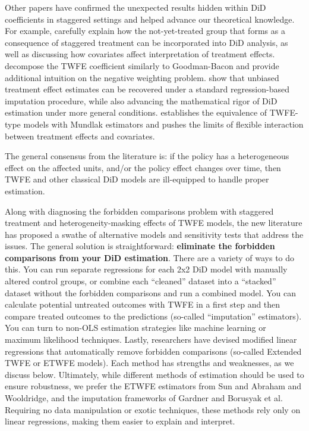 \documentclass[12pt]{article}
\begin{document}
Other papers have confirmed the unexpected results hidden within DiD coefficients in staggered settings and helped advance our theoretical knowledge. For example, \citet{CS2021} carefully explain how the not-yet-treated group that forms as a consequence of staggered treatment can be incorporated into DiD analysis, as well as discussing how covariates affect interpretation of treatment effects. \citet{de2020two} decompose the TWFE coefficient similarly to Goodman-Bacon and provide additional intuition on the negative weighting problem. \citet{borusyak2024revisiting} show that unbiased treatment effect estimates can be recovered under a standard regression-based imputation procedure, while also advancing the mathematical rigor of DiD estimation under more general conditions. \citet{wooldridge2021two} establishes the equivalence of TWFE-type models with Mundlak estimators and pushes the limits of flexible interaction between treatment effects and covariates.

The general consensus from the literature is: if the policy has a heterogeneous effect on the affected units, and/or the policy effect changes over time, then TWFE and other classical DiD models are ill-equipped to handle proper estimation.

Along with diagnosing the forbidden comparisons problem with staggered treatment and heterogeneity-masking effects of TWFE models, the new literature has proposed a swathe of alternative models and sensitivity tests that address the issues. The general solution is straightforward: \textbf{eliminate the forbidden comparisons from your DiD estimation}. There are a variety of ways to do this. You can run separate regressions for each 2x2 DiD model with manually altered control groups, or combine each “cleaned” dataset into a “stacked” dataset without the forbidden comparisons and run a combined model. You can calculate potential untreated outcomes with TWFE in a first step and then compare treated outcomes to the predictions (so-called “imputation” estimators). You can turn to non-OLS estimation strategies like machine learning or maximum likelihood techniques. Lastly, researchers have devised modified linear regressions that automatically remove forbidden comparisons (so-called Extended TWFE or ETWFE models).  Each method has strengths and weaknesses, as we discuss below. Ultimately, while different methods of estimation should be used to ensure robustness, we prefer the ETWFE estimators from Sun and Abraham and Wooldridge, and the imputation frameworks of Gardner and Borusyak et al.  Requiring no data manipulation or exotic techniques, these methods rely only on linear regressions, making them easier to explain and interpret.
\end{document}
